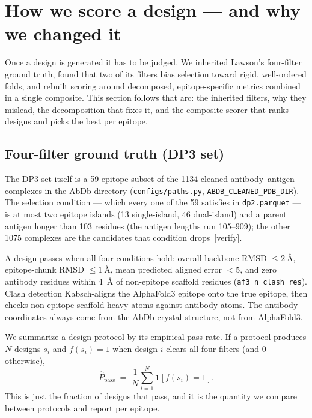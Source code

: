 \section{How we score a design --- and why we changed it}\label{sec:scoring}
Once a design is generated it has to be judged. We inherited Lawson's four-filter ground
truth, found that two of its filters bias selection toward rigid, well-ordered folds, and
rebuilt scoring around decomposed, epitope-specific metrics combined in a single composite.
This section follows that arc: the inherited filters, why they mislead, the decomposition that
fixes it, and the composite scorer that ranks designs and picks the best per epitope.

\subsection{Four-filter ground truth (DP3 set)}\label{sec:fourfilter}
The DP3 set itself is a \num{59}-epitope subset of the \num{1134} cleaned antibody--antigen
complexes in the AbDb directory (\texttt{configs/paths.py}, \texttt{ABDB\_CLEANED\_PDB\_DIR}).
The selection condition --- which every one of the \num{59} satisfies in \texttt{dp2.parquet}
--- is at most two epitope islands (\num{13} single-island, \num{46} dual-island) and a parent
antigen longer than \num{103} residues (the antigen lengths run \num{105}--\num{909}); the
other \num{1075} complexes are the candidates that condition drops~[verify].

A design passes when all four conditions hold: overall backbone RMSD $\le \SI{2}{\angstrom}$,
epitope-chunk RMSD $\le \SI{1}{\angstrom}$, mean predicted aligned error $< 5$, and zero
antibody residues within \SI{4}{\angstrom} of non-epitope scaffold residues
(\texttt{af3\_n\_clash\_res}). Clash detection Kabsch-aligns the AlphaFold3 epitope onto the
true epitope, then checks non-epitope scaffold heavy atoms against antibody atoms. The
antibody coordinates always come from the AbDb crystal structure, not from AlphaFold3.

We summarize a design protocol by its empirical pass rate. If a protocol produces $N$
designs $s_i$ and $f(s_i)=1$ when design $i$ clears all four filters (and $0$ otherwise),
\begin{equation}\label{eq:passrate}
\hat P_{\text{pass}} \;=\; \frac{1}{N}\sum_{i=1}^{N}\mathbf{1}\!\left[f(s_i)=1\right].
\end{equation}
This is just the fraction of designs that pass, and it is the quantity we compare between
protocols and report per epitope.

